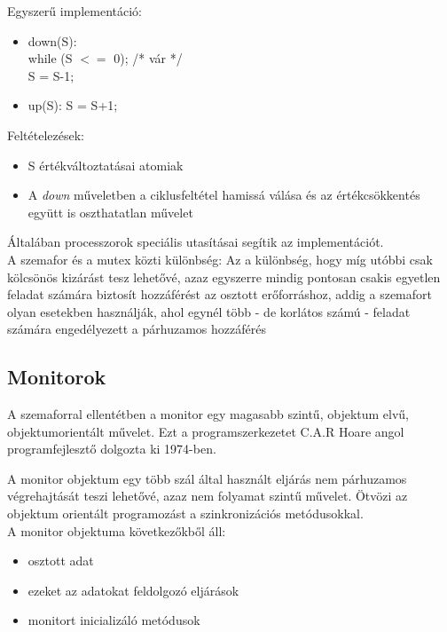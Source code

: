 \documentclass[tikz,12pt,margin=0px]{article}
\begin{document}
    Egyszerű implementáció:
    \begin{itemize}[topsep=8pt,itemsep=4pt,partopsep=4pt, parsep=4pt]
        \item down(S):\\
while (S $<=$ 0); /* vár */\\
S = S-1;
        \item up(S):
S = S+1;
    \end{itemize}
    \noindent Feltételezések:
    \begin{itemize}
            \item S értékváltoztatásai atomiak
            \item A \emph{down} műveletben a ciklusfeltétel hamissá válása és az értékcsökkentés együtt is oszthatatlan művelet
    \end{itemize}

    \noindent Általában processzorok speciális utasításai segítik az implementációt.\\

    \noindent A szemafor és a mutex közti különbség: Az a különbség, hogy míg utóbbi csak kölcsönös kizárást tesz lehetővé, azaz egyszerre mindig pontosan csakis egyetlen feladat számára biztosít hozzáférést az osztott erőforráshoz, addig a szemafort olyan esetekben használják, ahol egynél több - de korlátos számú - feladat számára engedélyezett a párhuzamos hozzáférés

    \subsection*{Monitorok}

    A szemaforral ellentétben a monitor egy magasabb szintű, objektum elvű, objektumorientált művelet. Ezt a programszerkezetet C.A.R Hoare angol programfejlesztő  dolgozta ki 1974-ben. \

    \noindent A monitor objektum egy több szál által használt eljárás nem párhuzamos végrehajtását teszi lehetővé, azaz nem folyamat szintű művelet. Ötvözi az objektum orientált programozást a szinkronizációs metódusokkal.\\

    \noindent A monitor objektuma következőkből áll:

    \begin{itemize}[topsep=8pt,itemsep=4pt,partopsep=4pt, parsep=4pt]
        \item osztott adat
        \item ezeket az adatokat feldolgozó eljárások
        \item monitort inicializáló metódusok
    \end{itemize}
\end{document}
